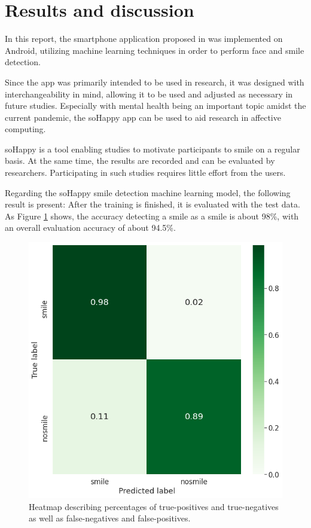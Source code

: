 \section{Results and discussion} \label{sec:results_and_discussion}

In this report, the smartphone application proposed in \cite{sohappy} was 
implemented on Android, utilizing machine learning techniques in order to 
perform face and smile detection.

Since the app was primarily intended to be used in research, it was designed
with interchangeability in mind, allowing it to be used and adjusted as 
necessary in future studies. Especially with mental health being an important
topic amidst the current pandemic, the soHappy app can be used to aid research 
in affective computing.

soHappy is a tool enabling studies to motivate participants to smile on a 
regular basis. At the same time, the results are recorded and can be evaluated 
by researchers. Participating in such studies requires little effort from the 
users.

Regarding the soHappy smile detection machine learning model, the following
result is present: After the training is finished, it is evaluated with the
test data. As Figure \ref{fig:training_result} shows, the accuracy detecting a
smile as a smile is about 98\%, with an overall evaluation accuracy of about 
94.5\%.

\begin{figure}
  \includegraphics[width=\linewidth]{figures/training_result.png}
  \caption{Heatmap describing percentages of true-positives and true-negatives as well as false-negatives and false-positives.}
  \label{fig:training_result}
\end{figure}

